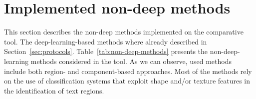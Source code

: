 
\section{Implemented non-deep methods}

This section describes the non-deep methods implemented on the comparative tool. The deep-learning-based methods where already described in Section~\ref{sec:protocols}. Table~\ref{tab:non-deep-methods} presents the non-deep-learning methods considered in the tool. As we can observe, used methods include both region- and component-based approaches. Most of the methods rely on the use of classification systems that exploit shape and/or texture features in the identification of text regions.

\newpage

  
